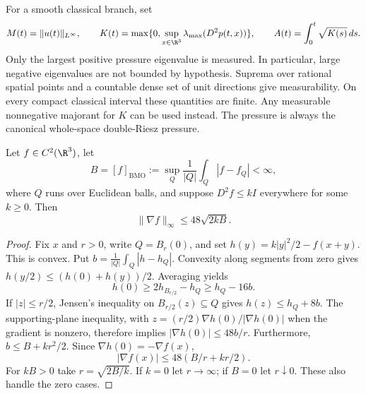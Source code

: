 For a smooth classical branch, set
\[
 M(t)=\|u(t)\|_{L^\infty},\qquad
 K(t)=\max\{0,\sup_{x\in\R^3}\lambda_{\max}(D^2p(t,x))\},\qquad
 A(t)=\int_0^t\sqrt{K(s)}\,ds.
\]
Only the largest positive pressure eigenvalue is measured. In particular,
large negative eigenvalues are not bounded by hypothesis. Suprema over
rational spatial points and a countable dense set of unit directions give
measurability. On every compact classical interval these quantities are
finite. Any measurable nonnegative majorant for $K$ can be used instead.
The pressure is always the canonical whole-space double-Riesz pressure.

\begin{lemma}
\label{pc:semiconcavity}
Let $f\in C^2(\R^3)$, let
\[
 B=[f]_{\mathrm{BMO}}:=\sup_Q\frac{1}{|Q|}\int_Q|f-f_Q|<\infty,
\]
where $Q$ runs over Euclidean balls, and suppose $D^2f\le kI$ everywhere
for some $k\ge0$. Then
\[
 \|\nabla f\|_\infty\le48\sqrt{2kB}.
\]
\end{lemma}
\begin{proof}
Fix $x$ and $r>0$, write $Q=B_r(0)$, and set
$h(y)=k|y|^2/2-f(x+y)$. This is convex. Put
$b=\frac{1}{|Q|}\int_Q|h-h_Q|$. Convexity along segments from zero gives
$h(y/2)\le(h(0)+h(y))/2$. Averaging yields
\[
 h(0)\ge2h_{B_{r/2}}-h_Q\ge h_Q-16b.
\]
If $|z|\le r/2$, Jensen's inequality on $B_{r/2}(z)\subseteq Q$ gives
$h(z)\le h_Q+8b$. The supporting-plane inequality, with
$z=(r/2)\nabla h(0)/|\nabla h(0)|$ when the gradient is nonzero, therefore
implies $|\nabla h(0)|\le48b/r$. Furthermore,
$b\le B+kr^2/2$. Since $\nabla h(0)=-\nabla f(x)$,
\[
 |\nabla f(x)|\le48(B/r+kr/2).
\]
For $kB>0$ take $r=\sqrt{2B/k}$. If $k=0$ let $r\to\infty$;
if $B=0$ let $r\downarrow0$. These also handle the zero cases.
\end{proof}

